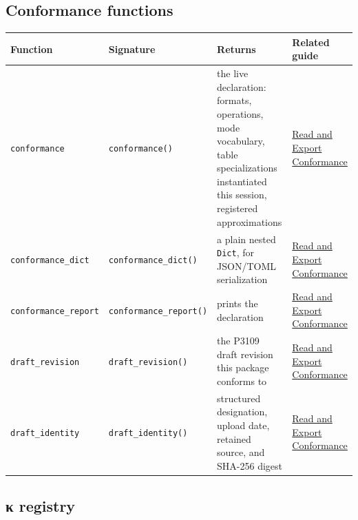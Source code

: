 \subsection{Conformance functions}



\label{8429749652979037907}{}



\begin{table}[h]
\centering
\begin{tabulary}{\linewidth}{L L L L}
\toprule
Function & Signature & Returns & Related guide \\
\toprule
\texttt{conformance} & \texttt{conformance()} & the live declaration: formats, operations, mode vocabulary, table specializations instantiated this session, registered approximations & \href{workflow\_\allowbreak{}conformance.md}{Read and Export Conformance} \\
\texttt{conformance\_\allowbreak{}dict} & \texttt{conformance\_\allowbreak{}dict()} & a plain nested \texttt{Dict}, for JSON/TOML serialization & \href{workflow\_\allowbreak{}conformance.md}{Read and Export Conformance} \\
\texttt{conformance\_\allowbreak{}report} & \texttt{conformance\_\allowbreak{}report()} & prints the declaration & \href{workflow\_\allowbreak{}conformance.md}{Read and Export Conformance} \\
\texttt{draft\_\allowbreak{}revision} & \texttt{draft\_\allowbreak{}revision()} & the P3109 draft revision this package conforms to & \href{workflow\_\allowbreak{}conformance.md}{Read and Export Conformance} \\
\texttt{draft\_\allowbreak{}identity} & \texttt{draft\_\allowbreak{}identity()} & structured designation, upload date, retained source, and SHA-256 digest & \href{workflow\_\allowbreak{}conformance.md}{Read and Export Conformance} \\
\bottomrule
\end{tabulary}

\end{table}



\subsection{κ registry}



\label{958257881295565054}{}



